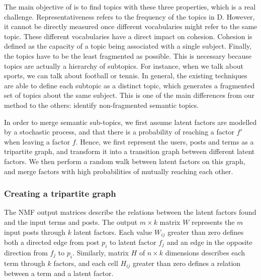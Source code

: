 The main objective of \method is to find topics with these three properties, which is a real challenge. Representativeness refers to the frequency of
the topics in D. However, it cannot be directly measured once different
vocabularies might refer to the same topic. These different vocabularies have
a direct impact on cohesion. Cohesion is defined as the capacity of a topic
being associated with a single subject. Finally, the topics have to be the
least fragmented as possible. This is necessary because topics are actually a
hierarchy of subtopics. For instance, when we talk about sports, we can talk
about football or tennis. In general, the existing techniques are able to
define each subtopic as a distinct topic, which generates a fragmented set of
topics about the same subject. This is one of the main differences from our
method to the others: identify non-fragmented semantic topics.

In order to merge semantic sub-topics, we first assume latent factors are modelled by a stochastic process, and that there is a
probability of reaching a factor $f'$ when leaving a factor $f$. Hence, we first represent the users, posts and terms as a tripartite graph, and transform it into a transition graph between different latent factors. We then perform a random walk between latent factors on this graph, and merge factors with high probabilities of mutually reaching each other.


\subsubsection{Creating a tripartite graph}

The NMF output matrices describe the relations between the latent factors found and the input terms and posts. The output $m \times k$ matrix $W$ represents the $m$ input posts through $k$ latent
factors. Each value $W_{ij}$ greater than zero defines both a directed edge
from post $p_i$ to latent factor $f_j$ and an edge in the opposite direction
from $f_j$ to $p_i$. Similarly, matrix $H$ of $n \times k$ dimensions
describes each term through $k$ factors, and each cell $H_{ij}$ greater than
zero defines a relation between a term and a latent factor.


